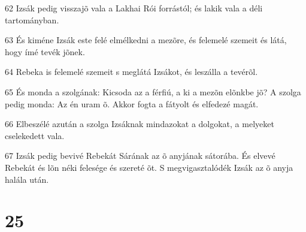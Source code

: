 \par 62 Izsák pedig visszajõ vala a Lakhai Rói forrástól; és lakik vala a déli tartományban.
\par 63 És kiméne Izsák este felé elmélkedni a mezõre, és felemelé szemeit és látá, hogy ímé tevék jõnek.
\par 64 Rebeka is felemelé szemeit s meglátá Izsákot, és leszálla a tevérõl.
\par 65 És monda a szolgának: Kicsoda az a férfiú, a ki a mezõn elõnkbe jõ? A szolga pedig monda: Az én uram õ. Akkor fogta a fátyolt és elfedezé magát.
\par 66 Elbeszélé azután a szolga Izsáknak mindazokat a dolgokat, a melyeket cselekedett vala.
\par 67 Izsák pedig bevivé Rebekát Sárának az õ anyjának sátorába. És elvevé Rebekát és lõn néki felesége és szereté õt. S megvigasztalódék Izsák az õ anyja halála után.

\chapter{25}

